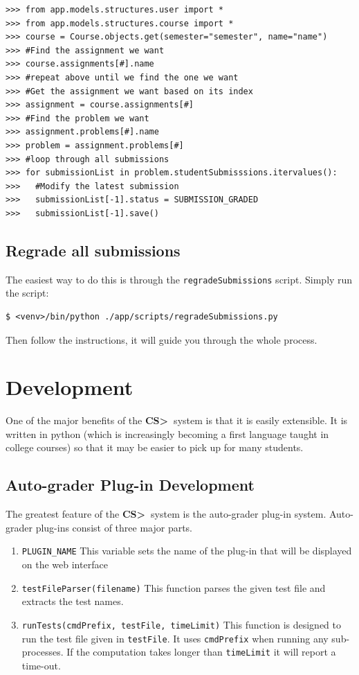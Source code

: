 \documentclass[11pt]{report}
\newcommand{\csgt}[0]{\textbf{CS\textgreater\ }}
\begin{document}
\begin{verbatim}
>>> from app.models.structures.user import *
>>> from app.models.structures.course import *
>>> course = Course.objects.get(semester="semester", name="name")
>>> #Find the assignment we want
>>> course.assignments[#].name
>>> #repeat above until we find the one we want
>>> #Get the assignment we want based on its index
>>> assignment = course.assignments[#]
>>> #Find the problem we want
>>> assignment.problems[#].name
>>> problem = assignment.problems[#]
>>> #loop through all submissions
>>> for submissionList in problem.studentSubmisssions.itervalues():
>>>   #Modify the latest submission
>>>   submissionList[-1].status = SUBMISSION_GRADED
>>>   submissionList[-1].save()
\end{verbatim}

\section{Regrade all submissions}
The easiest way to do this is through the \texttt{regradeSubmissions} script. 
Simply run the script:
\begin{verbatim}
$ <venv>/bin/python ./app/scripts/regradeSubmissions.py
\end{verbatim}

Then follow the instructions, it will guide you through the whole process.


\chapter{Development}
\label{ch:develop}
One of the major benefits of the \csgt system is that it is easily extensible. 
It is written in python (which is increasingly becoming a first language taught in
college courses) so that it may be easier to pick up for many students.

\section{Auto-grader Plug-in Development}
The greatest feature of the \csgt system is the auto-grader plug-in system. Auto-grader
plug-ins consist of three major parts.

\begin{enumerate}
\item \texttt{PLUGIN\_NAME} This variable sets the name of the plug-in that will be
displayed on the web interface
\item \texttt{testFileParser(filename)} This function parses the given test file and
extracts the test names.
\item \texttt{runTests(cmdPrefix, testFile, timeLimit)} This function is designed to 
run the test file given in \texttt{testFile}. It uses \texttt{cmdPrefix} when running
any sub-processes. If the computation takes longer than \texttt{timeLimit} it will
report a time-out.
\end{enumerate}
\end{document}
